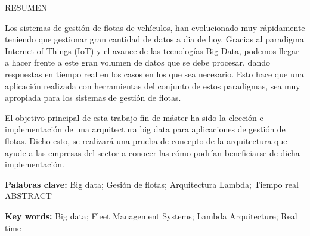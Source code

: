 {\huge\noindent RESUMEN}

Los sistemas de gestión de flotas de vehículos, han evolucionado muy rápidamente teniendo que gestionar gran cantidad de datos a dia de hoy. Gracias al paradigma Internet-of-Things (IoT) y el avance de las tecnologías Big Data, podemos llegar  a hacer frente a este gran volumen de datos que se debe procesar, dando respuestas en tiempo real en los casos en los que sea necesario. Esto hace que una aplicación realizada con herramientas del conjunto de estos paradigmas, sea muy apropiada para los sistemas de gestión de flotas.

El objetivo principal de esta trabajo fin de máster ha sido la elección e implementación de una arquitectura big data para aplicaciones de gestión de flotas. Dicho esto, se realizará una prueba de concepto de la arquitectura que ayude a las empresas del sector a conocer las cómo podrían beneficiarse de dicha implementación.







\hfill \break
\hfill \break
\textbf{Palabras clave:} Big data; Gesión de flotas; Arquitectura Lambda; Tiempo real
\newpage
{\huge\noindent ABSTRACT}



\hfill \break
\hfill \break
\textbf{Key  words:} Big data; Fleet Management Systems; Lambda Arquitecture; Real time
